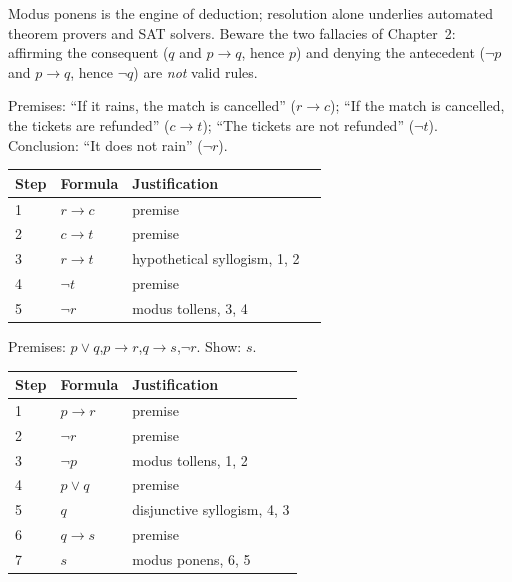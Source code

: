 \begin{notebox}
Modus ponens is the engine of deduction; resolution alone underlies automated
theorem provers and SAT solvers. Beware the two fallacies of Chapter~2:
affirming the consequent ($q$ and $p \to q$, hence $p$) and denying the
antecedent ($\neg p$ and $p \to q$, hence $\neg q$) are \emph{not} valid
rules.
\end{notebox}

\begin{example}\label{ex:inf1}
Premises: ``If it rains, the match is cancelled'' ($r \to c$); ``If the match
is cancelled, the tickets are refunded'' ($c \to t$); ``The tickets are not
refunded'' ($\neg t$). Conclusion: ``It does not rain'' ($\neg r$).

\begin{center}
\begin{tabular}{llll}
\toprule
Step & Formula & Justification\\
\midrule
1 & $r \to c$ & premise\\
2 & $c \to t$ & premise\\
3 & $r \to t$ & hypothetical syllogism, 1, 2\\
4 & $\neg t$ & premise\\
5 & $\neg r$ & modus tollens, 3, 4\\
\bottomrule
\end{tabular}
\end{center}
\end{example}

\begin{example}\label{ex:inf2}
Premises: $p \vee q$,\quad $p \to r$,\quad $q \to s$,\quad $\neg r$.
Show: $s$.

\begin{center}
\begin{tabular}{lll}
\toprule
Step & Formula & Justification\\
\midrule
1 & $p \to r$ & premise\\
2 & $\neg r$ & premise\\
3 & $\neg p$ & modus tollens, 1, 2\\
4 & $p \vee q$ & premise\\
5 & $q$ & disjunctive syllogism, 4, 3\\
6 & $q \to s$ & premise\\
7 & $s$ & modus ponens, 6, 5\\
\bottomrule
\end{tabular}
\end{center}
\end{example}

